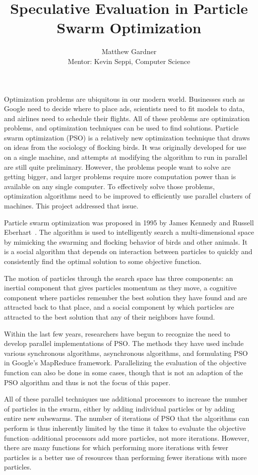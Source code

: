\documentclass[onecolumn, 12pt]{article}
\title{Speculative Evaluation in Particle Swarm Optimization}
\author{Matthew Gardner\\Mentor: Kevin Seppi, Computer Science}
\date{}
\begin{document}
\maketitle

Optimization problems are ubiquitous in our modern world.  Businesses such as
Google need to decide where to place ads, scientists need to fit models to
data, and airlines need to schedule their flights.  All of these problems are
optimization problems, and optimization techniques can be used to find
solutions.  Particle swarm optimization (PSO) is a relatively new optimization
technique that draws on ideas from the sociology of flocking birds.  It was
originally developed for use on a single machine, and attempts at modifying the
algorithm to run in parallel are still quite preliminary.  However, the
problems people want to solve are getting bigger, and larger problems require
more computation power than is available on any single computer.  To
effectively solve those problems, optimization algorithms need to be improved
to efficiently use parallel clusters of machines.  This project addressed that
issue.

Particle swarm optimization was proposed in 1995 by James Kennedy and Russell
Eberhart~\cite{kennedy-icnn95}.  The algorithm is used to intelligently search
a multi-dimensional space by mimicking the swarming and flocking behavior of
birds and other animals. It is a social algorithm that depends on interaction
between particles to quickly and consistently find the optimal solution to some
objective function.

The motion of particles through the search space has three components: an
inertial component that gives particles momentum as they move, a cognitive
component where particles remember the best solution they have found and are
attracted back to that place, and a social component by which particles are
attracted to the best solution that any of their neighbors have found.

Within the last few years, researchers have begun to recognize the need to
develop parallel implementations of PSO.  The methods they have used include
various synchronous algorithms, asynchronous algorithms, and formulating PSO in
Google's MapReduce framework.  Parallelizing the evaluation of the objective
function can also be done in some cases, though that is not an adaption of the
PSO algorithm and thus is not the focus of this paper.

All of these parallel techniques use additional processors to increase the
number of particles in the swarm, either by adding individual particles or by
adding entire new subswarms.  The number of iterations of PSO that the
algorithms can perform is thus inherently limited by the time it takes to
evaluate the objective function--additional processors add more particles, not
more iterations.  However, there are many functions for which performing more
iterations with fewer particles is a better use of resources than performing
fewer iterations with more particles.
\end{document}
